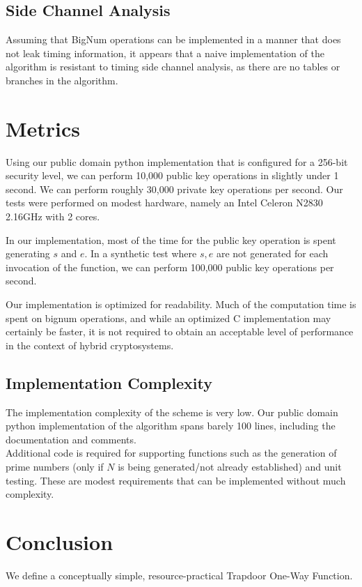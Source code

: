 \documentclass[preprint]{iacrtrans}
\begin{document}
\subsection{Side Channel Analysis}
Assuming that BigNum operations can be implemented in a manner that does not leak timing information, it appears that a naive implementation of the algorithm is resistant to timing side channel analysis, as there are no tables or branches in the algorithm.

\section{Metrics}
Using our public domain python implementation that is configured for a 256-bit security level, we can perform 10,000 public key operations in slightly under 1 second. We can perform roughly 30,000 private key operations per second. Our tests were performed on modest hardware, namely an Intel Celeron N2830 2.16GHz with 2 cores. 

In our implementation, most of the time for the public key operation is spent generating $s$ and $e$. In a synthetic test where $s, e$ are not generated for each invocation of the function, we can perform 100,000 public key operations per second.

Our implementation is optimized for readability. Much of the computation time is spent on bignum operations, and while an optimized C implementation may certainly be faster, it is not required to obtain an acceptable level of performance in the context of hybrid cryptosystems. 

\subsection{Implementation Complexity}
The implementation complexity of the scheme is very low. Our public domain python implementation of the algorithm spans barely 100 lines, including the documentation and comments.\\

Additional code is required for supporting functions such as the generation of prime numbers (only if $N$ is being generated/not already established) and unit testing. These are modest requirements that can be implemented without much complexity. \\

\section{Conclusion}
We define a conceptually simple, resource-practical Trapdoor One-Way Function. 
\end{document}
